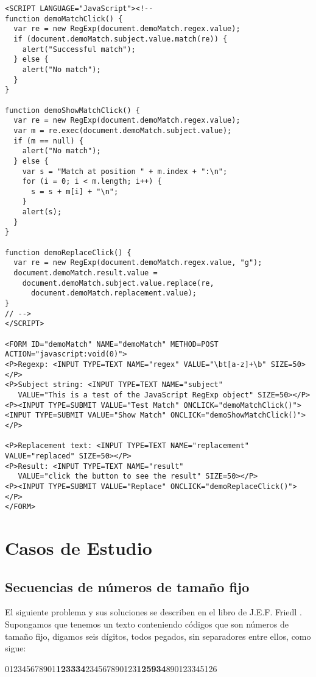 \begin{verbatim}
<SCRIPT LANGUAGE="JavaScript"><!--
function demoMatchClick() {
  var re = new RegExp(document.demoMatch.regex.value);
  if (document.demoMatch.subject.value.match(re)) {
    alert("Successful match");
  } else {
    alert("No match");
  }
}

function demoShowMatchClick() {
  var re = new RegExp(document.demoMatch.regex.value);
  var m = re.exec(document.demoMatch.subject.value);
  if (m == null) {
    alert("No match");
  } else {
    var s = "Match at position " + m.index + ":\n";
    for (i = 0; i < m.length; i++) {
      s = s + m[i] + "\n";
    }
    alert(s);
  }
}

function demoReplaceClick() {
  var re = new RegExp(document.demoMatch.regex.value, "g");
  document.demoMatch.result.value = 
    document.demoMatch.subject.value.replace(re, 
      document.demoMatch.replacement.value);
}
// -->
</SCRIPT>

<FORM ID="demoMatch" NAME="demoMatch" METHOD=POST ACTION="javascript:void(0)">
<P>Regexp: <INPUT TYPE=TEXT NAME="regex" VALUE="\bt[a-z]+\b" SIZE=50></P>
<P>Subject string: <INPUT TYPE=TEXT NAME="subject" 
   VALUE="This is a test of the JavaScript RegExp object" SIZE=50></P>
<P><INPUT TYPE=SUBMIT VALUE="Test Match" ONCLICK="demoMatchClick()">
<INPUT TYPE=SUBMIT VALUE="Show Match" ONCLICK="demoShowMatchClick()"></P>

<P>Replacement text: <INPUT TYPE=TEXT NAME="replacement" VALUE="replaced" SIZE=50></P>
<P>Result: <INPUT TYPE=TEXT NAME="result" 
   VALUE="click the button to see the result" SIZE=50></P>
<P><INPUT TYPE=SUBMIT VALUE="Replace" ONCLICK="demoReplaceClick()"></P>
</FORM>
\end{verbatim}

\section{Casos de Estudio}

\subsection{Secuencias de números de tamaño fijo}
\label{section:numeros}
El siguiente problema y sus soluciones se describen en el libro de J.E.F. Friedl
\cite{friedl}.
Supongamos que tenemos un texto conteniendo códigos que son 
números de tamaño fijo, digamos 
seis dígitos, todos pegados, sin separadores entre ellos, como sigue:

\begin{center}
\begin{tt} 
012345678901{\bf123334}234567890123{\bf125934}890123345126
\end{tt} 
\end{center}

